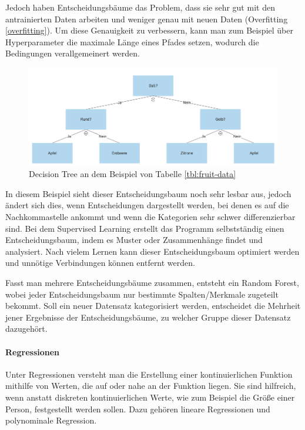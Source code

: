 Jedoch haben Entscheidungsbäume das Problem, dass sie sehr gut mit den antrainierten Daten arbeiten und weniger genau mit neuen Daten (Overfitting \ref{overfitting}). Um diese Genauigkeit zu verbessern, kann man zum Beispiel über Hyperparameter die maximale Länge eines Pfades setzen, wodurch die Bedingungen verallgemeinert werden.

\begin{figure}[H]
      \centering
      \includegraphics[scale=0.5]{sections/machine-learning/images/decision-tree.png}
      \caption{Decision Tree an dem Beispiel von Tabelle \ref{tbl:fruit-data}}
\end{figure}

In diesem Beispiel sieht dieser Entscheidungsbaum noch sehr lesbar aus, jedoch ändert sich dies, wenn Entscheidungen dargestellt werden, bei denen es auf die Nachkommastelle ankommt und wenn die Kategorien sehr schwer differenzierbar sind. Bei dem Supervised Learning erstellt das Programm selbstständig einen Entscheidungsbaum, indem es Muster oder Zusammenhänge findet und analysiert. Nach vielem Lernen kann dieser Entscheidungsbaum optimiert werden und unnötige Verbindungen können entfernt werden.

Fasst man mehrere Entscheidungsbäume zusammen, entsteht ein Random Forest, wobei jeder Entscheidungsbaum nur bestimmte Spalten/Merkmale zugeteilt bekommt. Soll ein neuer Datensatz kategorisiert werden, entscheidet die Mehrheit jener Ergebnisse der Entscheidungsbäume, zu welcher Gruppe dieser Datensatz dazugehört.

\paragraph{Regressionen} Unter Regressionen versteht man die Erstellung einer kontinuierlichen Funktion mithilfe von Werten, die auf oder nahe an der Funktion liegen. Sie sind hilfreich, wenn anstatt diskreten kontinuierlichen Werte, wie zum Beispiel die Größe einer Person, festgestellt werden sollen. Dazu gehören lineare Regressionen und polynominale Regression.

